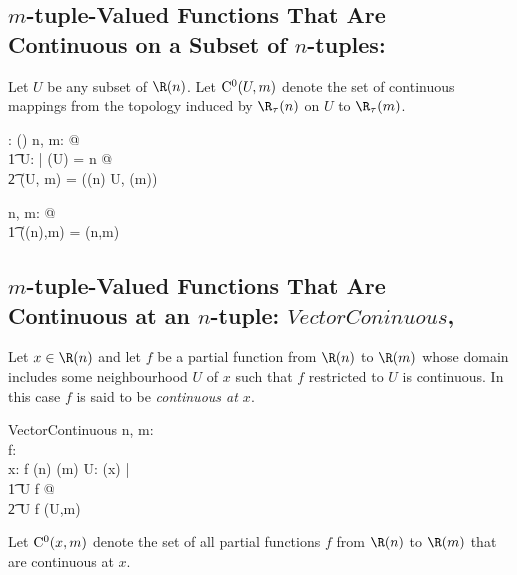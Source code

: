 \documentclass{amsart}
\begin{document}
\subsection{$m$-tuple-Valued Functions That Are Continuous on a Subset of $n$-tuples: }

Let $U$ be any subset of $\Rtup(n)$.
Let $\operatorname{C^0}(U,m)$ denote the set of continuous mappings from the topology induced by $\tsRtup(n)$ on $U$ to $\tsRtup(m)$.

\begin{axdef}
	\CzeroSubsetRtupRtup: \DeltaRinf \cross \nat \fun \power (\Rinf \pfun \Rinf)
\where
	\forall n, m: \nat @ \\
	\t1	\forall U: \DeltaRinf | \dimRinf(U) = n @ \\
	\t2		\CzeroSubsetRtupRtup(U, m) = \CzeroTT(\tsRtup(n) \inducedTopSp U, \tsRtup(m))
\end{axdef}

\begin{remark}

\begin{zed}
	\forall n, m: \nat @ \\
	\t1	\CzeroSubsetRtupRtup(\Rtup(n),m) = \CzeroRtupRtup(n,m)
\end{zed}

\end{remark}

\subsection{$m$-tuple-Valued Functions That Are Continuous at an $n$-tuple: 
$VectorConinuous$, }

Let $x \in \Rtup(n)$ and let $f$ be a partial function from $\Rtup(n)$ to $\Rtup(m)$
whose domain includes some neighbourhood $U$ of $x$ such that $f$ restricted to $U$ is continuous.
In this case $f$ is said to be {\it continuous at $x$}.

\begin{schema}{VectorContinuous}
	n, m: \nat \\
	f: \Rinf \pfun \Rinf \\
	x: \Rinf
\where
	f \in \Rtup(n) \pfun \Rtup(m)
\also
	\exists U: \neighRinf(x) | \\
	\t1	U \subseteq \dom f @ \\
	\t2		U \dres f \in \CzeroSubsetRtupRtup(U,m)
\end{schema}

Let $\operatorname{C^0}(x,m)$ denote the set of all partial functions $f$ from $\Rtup(n)$ to $\Rtup(m)$
that are continuous at $x$.
\end{document}
